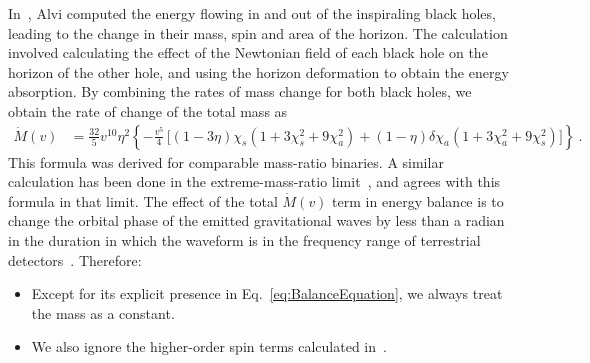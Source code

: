 In~\cite{Alvi:2001}, Alvi computed the energy flowing in and out of the 
inspiraling black holes, leading to the change in their mass, spin and area of
the horizon. The calculation involved calculating the effect of the Newtonian
field of each black hole on the horizon of the other hole, and using the
horizon deformation to obtain the energy absorption. By combining the 
rates of mass change for both black holes, we obtain the rate of change
of the total mass as
\begin{equation}
  \label{eq:MassRateOfChange}
  \begin{split}
    \dot{M}(v) &= \frac{32}{5} v^{10} \eta^{2} \left\{
      -\frac{v^{5}}{4}\, \Big[ (1 - 3\eta) \chi_{s} (1 + 3\chi_{s}^{2}
      + 9\chi_{a}^{2}) + (1 - \eta) \delta \chi_{a} (1 + 3\chi_{a}^{2}
      + 9\chi_{s}^{2}) \Big] \right\}~.
  \end{split}
\end{equation}
This formula was derived for comparable mass-ratio binaries.
A similar calculation has been done in the
extreme-mass-ratio limit~\cite{Tagoshi:1997}, and agrees with this
formula in that limit. The effect of the 
total $\dot{M}(v)$ term in energy balance is to change the orbital
phase of the emitted gravitational waves by less than a radian
in the duration in which the waveform is in the frequency range 
of terrestrial detectors~\cite{Alvi:2001}. Therefore:
\begin{itemize}
 \item Except for its explicit presence in Eq.~\eqref{eq:BalanceEquation},
 we always treat the mass as a constant. 
 \item We also ignore the higher-order spin terms calculated 
 in~\cite{Alvi:2001}. 
\end{itemize}


